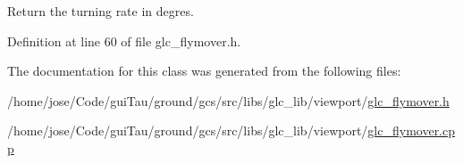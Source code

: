 Return the turning rate in degres. 



Definition at line 60 of file glc\-\_\-flymover.\-h.



The documentation for this class was generated from the following files\-:\begin{DoxyCompactItemize}
\item 
/home/jose/\-Code/gui\-Tau/ground/gcs/src/libs/glc\-\_\-lib/viewport/\hyperlink{glc__flymover_8h}{glc\-\_\-flymover.\-h}\item 
/home/jose/\-Code/gui\-Tau/ground/gcs/src/libs/glc\-\_\-lib/viewport/\hyperlink{glc__flymover_8cpp}{glc\-\_\-flymover.\-cpp}\end{DoxyCompactItemize}
